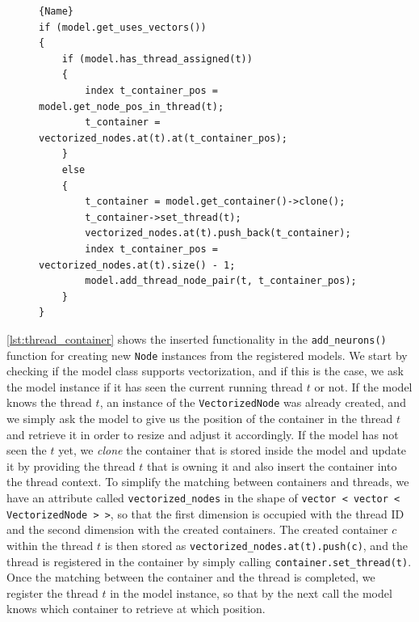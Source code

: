 \begin{figure}[ht!]
    \centering
\begin{lstlisting}[caption=Assigning containers to threads,frame=tlrb, label=lst:thread_container]{Name}
if (model.get_uses_vectors())
{
    if (model.has_thread_assigned(t))
    {
        index t_container_pos = model.get_node_pos_in_thread(t);
        t_container = vectorized_nodes.at(t).at(t_container_pos);
    }
    else
    {
        t_container = model.get_container()->clone();
        t_container->set_thread(t);
        vectorized_nodes.at(t).push_back(t_container);
        index t_container_pos = vectorized_nodes.at(t).size() - 1;
        model.add_thread_node_pair(t, t_container_pos);
    }
}
\end{lstlisting}
\end{figure}

\autoref{lst:thread_container} shows the inserted functionality in the \texttt{add\_neurons()} function for creating new \texttt{Node} instances from the registered models. We start by checking if the model class supports vectorization, and if this is the case, we ask the model instance if it has seen the current running thread $t$ or not. If the model knows the thread $t$, an instance of the \texttt{VectorizedNode} was already created, and we simply ask the model to give us the position of the container in the thread $t$ and retrieve it in order to resize and adjust it accordingly. If the model has not seen the $t$ yet, we \emph{clone} the container that is stored inside the model and update it by providing the thread $t$ that is owning it and also insert the container into the thread context. To simplify the matching between containers and threads, we have an attribute called \texttt{vectorized\_nodes} in the shape of \texttt{vector < vector < VectorizedNode > >}, so that the first dimension is occupied with the thread ID and the second dimension with the created containers. The created container $c$ within the thread $t$ is then stored as \texttt{vectorized\_nodes.at(t).push(c)}, and the thread is registered in the container by simply calling \texttt{container.set\_thread(t)}. Once the matching between the container and the thread is completed, we register the thread $t$ in the model instance, so that by the next call the model knows which container to retrieve at which position.

